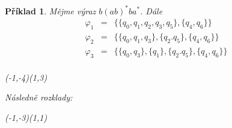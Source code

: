 \documentclass[10pt, a4paper, titlepage]{article}
\theoremstyle{note}
\newtheorem{priklad}{\textbf{Příklad}}
\begin{document}
\begin{priklad}
Mějme v\'yraz $b(ab)^{*}ba^{*}$. D\'ale
\begin{eqnarray*}
\varphi_{1} &=& \lbrace \lbrace q_{0},q_{1},q_{2},q_{3},q_{5} \rbrace, \lbrace q_{4}, q_{6} \rbrace \rbrace \\
\varphi_{2} &=& \lbrace \lbrace q_{0},q_{1},q_{3} \rbrace, \lbrace q_{2}.q_{5} \rbrace, \lbrace q_{4}, q_{6} \rbrace \rbrace \\
\varphi_{3} &=& \lbrace \lbrace q_{0},q_{3} \rbrace, \lbrace q_{1} \rbrace, \lbrace q_{2}.q_{5} \rbrace, \lbrace q_{4}, q_{6} \rbrace \rbrace \\
\end{eqnarray*}
\begin{center}
\begin{VCPicture}{(-1,-4)(1,3)}



\end{VCPicture}
\end{center}

N\'asledně rozklady:
\begin{center}
\begin{VCPicture}{(-1,-3)(1,1)}



\end{VCPicture}


\end{center}
\end{priklad}
\end{document}
